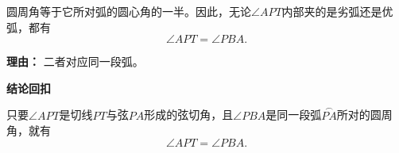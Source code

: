 \begin{proofbox}
\begin{description}[style=nextline, leftmargin=2.8em, labelsep=0.5em, itemsep=0.55em]
		\item[\textbf{步骤六（与圆周角对应）：}]
			圆周角等于它所对弧的圆心角的一半。因此，无论$\angle APT$内部夹的是劣弧还是优弧，都有
			\[
				\angle APT=\angle PBA.
			\]
			\par\textbf{理由：}
			二者对应同一段弧。
	\end{description}

	\medskip
	\textbf{\textcolor{CProof}{结论回扣}}

	只要$\angle APT$是切线$PT$与弦$PA$形成的弦切角，且$\angle PBA$是同一段弧$\overset{\frown}{PA}$所对的圆周角，就有
	\[
		\angle APT=\angle PBA.
	\]
\end{proofbox}